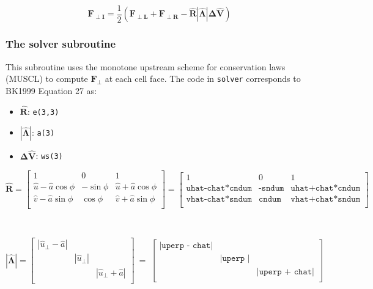 \documentclass{article}
\newcommand{\code}[1]{\texttt{#1}}
\begin{document}
\begin{equation}
\mathbf{F_{\perp I}} =
	 \frac{1}{2} (\mathbf{F_{\perp L}} + \mathbf{F_{\perp R}} - \mathbf{\hat{R} |\hat{\Lambda}| \Delta \hat V  })
	 \label{BK27}
\end{equation}


\subsubsection*{The solver subroutine}

This subroutine uses the monotone upstream scheme for conservation laws (MUSCL) to compute $\mathbf{F_\perp}$ at each cell face.  The code in \code{solver} corresponds to BK1999 Equation 27 as: 

 \begin{itemize}
 	\item $\mathbf{\hat{R}}$: \code{e(3,3)}
 	\item $\mathbf{|\hat{\Lambda}|}$: \code{a(3) }
 	\item $\mathbf{\Delta \hat V  }  $: \code{ws(3)} 
 \end{itemize}
 
 \[ \mathbf{\hat{R}} = 
\begin{bmatrix}
    1 &  0  & 1  \\
    \hat{u} -\hat{a} \cos{\phi} &   -\sin{\phi} & \hat{u} +\hat{a} \cos{\phi}   \\
    \hat{v} -\hat{a} \sin{\phi} &   \cos{\phi} & \hat{v} +\hat{a} \sin{\phi}    \\
\end{bmatrix} = 
\begin{bmatrix}
    1 &  0  & 1  \\
    \code{uhat-chat*cndum} &    \code{-sndum} &  \code{uhat+chat*cndum} \\
    \code{vhat-chat*sndum} &    \code{cndum} &  \code{vhat+chat*sndum} \\
\end{bmatrix}
\]

\
 
 \[ \mathbf{|\hat{\Lambda}|} = 
\begin{bmatrix}
  |\hat{u}_\perp - \hat a| &  &  \\
     &   |\hat{u}_\perp | &  \\ 
     & &  |\hat{u}_\perp  + \hat a| \\
\end{bmatrix} \ =  \
\begin{bmatrix}
 \code{|uperp - chat|} &  &  \\
     &    \code{|uperp |} &  \\ 
     & &   \code{|uperp + chat|} \\
\end{bmatrix} 
\]
\end{document}

